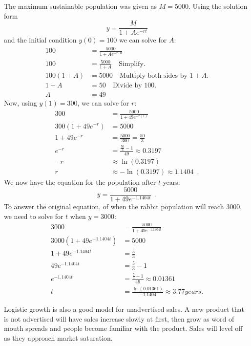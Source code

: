 \begin{example}
\begin{solution}
The maximum sustainable population was given as $M=5000$. Using the solution form
$$y=\frac{M}{1+Ae^{-rt}}$$
and the initial condition $y(0)=100$ we can solve for $A$:
\begin{align*}
  100       &= \frac{5000}{1+Ae^{-r\cdot 0}} \\
  100       &= \frac{5000}{1+A} \quad \text{Simplify.}\\
  100(1+A)  &= 5000 \quad \text{Multiply both sides by } 1+A.\\
  1+A       &= 50 \quad \text{Divide by 100.}\\
  A         &= 49
\end{align*}
Now, using $y(1)=300$, we can solve for $r$:
\begin{align*}
 300 &= \frac{5000}{1+49e^{-r(1)}} \\
 300(1+49e^{-r}) &= 5000\\
 1+49e^{-r} &= \frac{5000}{300} = \frac{50}{3}\\
 e^{-r} &= \frac{\frac{50}{3}-1}{49} \approx 0.3197 \\
 -r &\approx \ln(0.3197)\\
 r &\approx -\ln(0.3197)\approx   1.1404 \enspace .
\end{align*}
We now have the equation for the population after $t$ years:
$$y = \frac{5000}{1+49 e^{-1.1404t}} \enspace .$$
To answer the original equation, of when the rabbit population will reach 3000, we need to solve for $t$ when $y=3000$:
\begin{align*}
  3000                              &= \frac{5000}{1+49e^{-1.1404t}} \\
  3000\left(1+49e^{-1.1404t}\right) &= 5000\\
  1+49e^{-1.1404t}                  &= \frac{5}{3}\\
  49e^{-1.1404t}                    &= \frac{5}{3} - 1\\
  e^{-1.1404t}                      &= \frac{\frac{5}{3}-1}{49} \approx  0.01361 \\
  t                                 &= \frac{\ln(0.01361)}{-1.1404}\approx   3.77 years.
\end{align*}
\end{solution}\end{example}

Logistic growth is also a good model for unadvertised sales. A new product that is not advertised will have sales increase slowly at first, then grow as word of mouth spreads and people become familiar with the product. Sales will level off as they approach market saturation.
